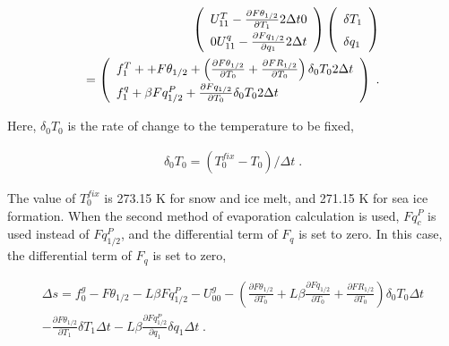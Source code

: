 \begin{eqnarray}
 \renewcommand{\arraystretch}{1.5}
  \left( \begin{array}{cc}
      U_{11}^T - \frac{\partial{F\theta_{1/2}}}{\partial {T_1}} 2 \Delta t
      0 \\
      0
      U_{11}^q - \frac{\partial{Fq_{1/2}}}{\partial {q_1}} 2 \Delta t \\
  \end{array} \right)
  \left( \begin{array}{l}
      \delta T_1 \\ \delta q_1 \\
  \end{array} \right)  \\
=
  \left( \begin{array}{l}
      f_1^T + + F\theta_{1/2}
      + \left( \frac{\partial{F\theta_{1/2}}}{\partial {T_0}}
                    + \frac{\partial{FR_{1/2}}}{\partial {T_0}} \right) \delta_0 T_0 2 \Delta t \\
      f_1^q +  \beta Fq^P_{1/2}
      + \frac{\partial{Fq_{1/2}}}{\partial {T_0}} \delta_0 T_0 2 \Delta t \\
  \end{array} \right) \; .
\end{eqnarray}

Here, \(\delta_0 T_0\) is the rate of change to the temperature to be
fixed,

\begin{eqnarray}
   \delta_0 T_0 = ( T_0^{fix} - T_0 ) / \Delta t \; .
\end{eqnarray}

The value of \(T_0^{fix}\) is 273.15 K for snow and ice melt, and 271.15
K for sea ice formation. When the second method of evaporation
calculation is used, \(Fq^P_c\) is used instead of \(Fq^P_{1/2}\), and
the differential term of \(F_q\) is set to zero. In this case, the
differential term of \(F_q\) is set to zero,

\begin{eqnarray}
\Delta s  =  f_0^g - F\theta_{1/2} - L \beta Fq^P_{1/2} - U_{00}^g
          -  \left(\frac{\partial{F\theta_{1/2}}}{\partial {T_0}}
                + L \beta \frac{\partial{Fq_{1/2}}}{\partial {T_0}}
                + \frac{\partial{FR_{1/2}}}{\partial {T_0}} \right) \delta_0 T_0 \Delta t
                 \\
          -  \frac{\partial{F\theta_{1/2}}}{\partial {T_1}} \delta T_1 \Delta t
                - L \beta \frac{\partial{Fq^P_{1/2}}}{\partial {q_1}} \delta q_1 \Delta t \; .
\end{eqnarray}

